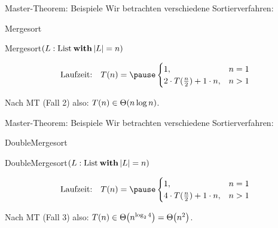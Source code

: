 \begin{frame}[t]{Master-Theorem: Beispiele} 
	Wir betrachten verschiedene Sortierverfahren:\\
	\bigskip
	
	\begin{exampleblock}{Mergesort}
		\begin{algorithm}[H]
			\KwMethod Mergesort$(L: \|List| \: \KwSty{with} \size{L} = n)$
		\end{algorithm}
	\end{exampleblock}	
	
	\[\text{Laufzeit:} \quad T(n) = \pause \begin{cases}
	1, & n = 1\\
	2 \cdot T(\fract n/2 ) + 1 \cdot n, & n > 1
	\end{cases}\]
	
	\pause
	Nach MT (Fall 2) also: $T(n) \in \Theta\!\left(n \log n\right)$.
\end{frame}

\begin{frame}[t]{Master-Theorem: Beispiele}
	Wir betrachten verschiedene Sortierverfahren:\\
	\bigskip
	
	\begin{exampleblock}{DoubleMergesort}
		\begin{algorithm}[H]
			\KwMethod DoubleMergesort$(L: \|List| \: \KwSty{with} \size{L} = n)$
		\end{algorithm}
	\end{exampleblock}	
	
	\[\text{Laufzeit:} \quad T(n) = \pause \begin{cases}
	1, & n = 1\\
	4 \cdot T(\fract n/2 ) + 1 \cdot n,  & n > 1
	\end{cases}\]
	
	\pause
	Nach MT (Fall 3) also: $T(n) \in \Theta\!\left(n^{\log_2 4}\right) = \Theta\!\left(n^2\right)$.
\end{frame}

